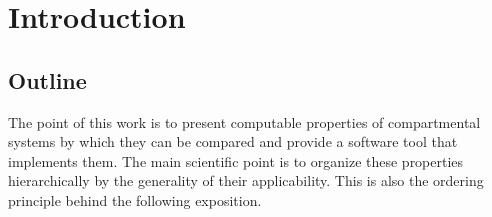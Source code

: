 %


%
%
%
%


\section{Introduction}
\subsection{Outline}
The point of this work is to present computable properties of compartmental
systems by which they can be compared and provide a software tool that
implements them.  The main scientific point is to organize these properties
hierarchically by the generality of their applicability. This is also the
ordering principle behind the following exposition. 

